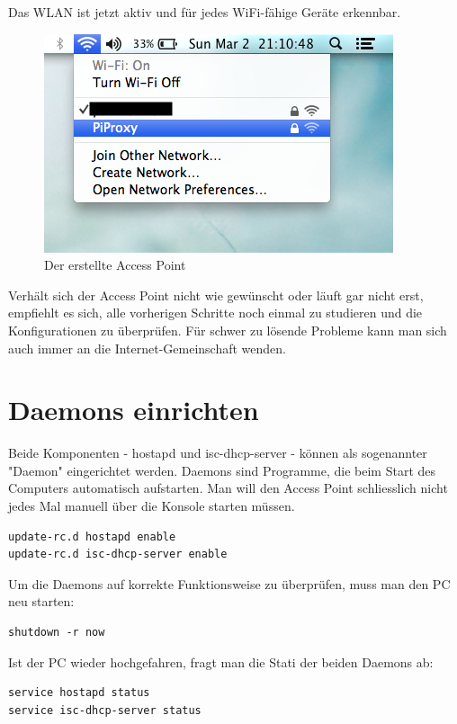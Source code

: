Das WLAN ist jetzt aktiv und für jedes WiFi-fähige Geräte erkennbar.

\begin{figure}[h]
\centering
\includegraphics[scale=0.7]{images/accesspoint}
\caption{Der erstellte Access Point}
\end{figure}

Verhält sich der Access Point nicht wie gewünscht oder läuft gar nicht erst, empfiehlt es sich, alle vorherigen Schritte noch einmal zu studieren und die Konfigurationen zu überprüfen. Für schwer zu lösende Probleme kann man sich auch immer an die Internet-Gemeinschaft wenden.

\section{Daemons einrichten}
Beide Komponenten - hostapd und isc-dhcp-server - können als sogenannter "Daemon" eingerichtet werden. Daemons sind Programme, die beim Start des Computers automatisch aufstarten. Man will den Access Point schliesslich nicht jedes Mal manuell über die Konsole starten müssen. 

\begin{lstlisting}
update-rc.d hostapd enable 
update-rc.d isc-dhcp-server enable
\end{lstlisting}

Um die Daemons auf korrekte Funktionsweise zu überprüfen, muss man den PC neu starten:

\begin{lstlisting}
shutdown -r now 
\end{lstlisting}

Ist der PC wieder hochgefahren, fragt man die Stati der beiden Daemons ab:

\begin{lstlisting}
service hostapd status
service isc-dhcp-server status
\end{lstlisting}

